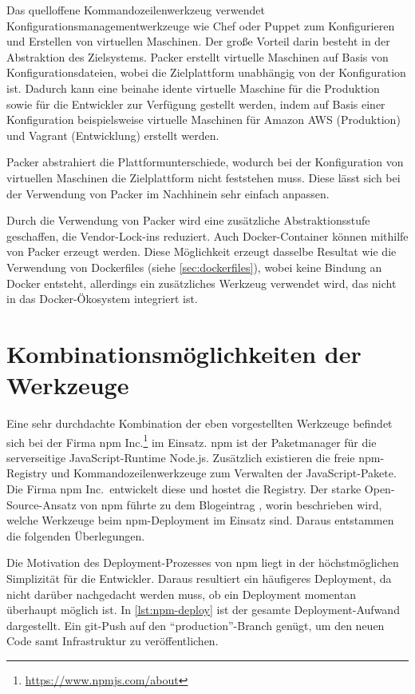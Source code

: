 Das quelloffene Kommandozeilenwerkzeug verwendet Konfigurationsmanagementwerkzeuge wie Chef oder Puppet zum Konfigurieren und Erstellen von virtuellen Maschinen.
Der große Vorteil darin besteht in der Abstraktion des Zielsystems.
Packer erstellt virtuelle Maschinen auf Basis von Konfigurationsdateien, wobei die Zielplattform unabhängig von der Konfiguration ist.
Dadurch kann eine beinahe idente virtuelle Maschine für die Produktion sowie für die Entwickler zur Verfügung gestellt werden, indem auf Basis einer Konfiguration beispielsweise virtuelle Maschinen für Amazon AWS (Produktion) und Vagrant (Entwicklung) erstellt werden.

Packer abstrahiert die Plattformunterschiede, wodurch bei der Konfiguration von virtuellen Maschinen die Zielplattform nicht feststehen muss.
Diese lässt sich bei der Verwendung von Packer im Nachhinein sehr einfach anpassen.

Durch die Verwendung von Packer wird eine zusätzliche Abstraktionsstufe geschaffen, die Vendor-Lock-ins reduziert.
Auch Docker-Container können mithilfe von Packer erzeugt werden.
Diese Möglichkeit erzeugt dasselbe Resultat wie die Verwendung von Dockerfiles (siehe \cref{sec:dockerfiles}), wobei keine Bindung an Docker entsteht, allerdings ein zusätzliches Werkzeug verwendet wird, das nicht in das Docker-Ökosystem integriert ist.


\section{Kombinationsmöglichkeiten der Werkzeuge}
\label{sec:werkzeugkombinationsmoeglichkeiten}
Eine sehr durchdachte Kombination der eben vorgestellten Werkzeuge befindet sich bei der Firma npm Inc.\footnote{\url{https://www.npmjs.com/about}} im Einsatz.
npm ist der Paketmanager für die serverseitige JavaScript-Runtime Node.js.
Zusätzlich existieren die freie npm-Registry und Kommandozeilenwerkzeuge zum Verwalten der JavaScript-Pakete.
Die Firma npm Inc.\ entwickelt diese und hostet die Registry.
Der starke Open-Source-Ansatz von npm führte zu dem Blogeintrag \autocite{npm-deployment:online}, worin beschrieben wird, welche Werkzeuge beim npm-Deployment im Einsatz sind. Daraus entstammen die folgenden Überlegungen.


Die Motivation des Deployment-Prozesses von npm liegt in der höchstmöglichen Simplizität für die Entwickler.
Daraus resultiert ein häufigeres Deployment, da nicht darüber nachgedacht werden muss, ob ein Deployment momentan überhaupt möglich ist.
In \cref{lst:npm-deploy} ist der gesamte Deployment-Aufwand dargestellt.
Ein git-Push auf den "`production"'-Branch genügt, um den neuen Code samt Infrastruktur zu veröffentlichen.

